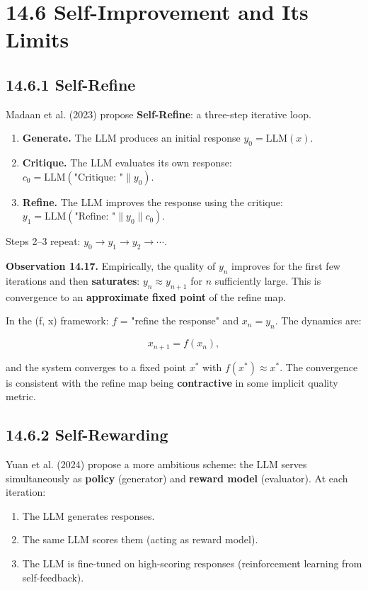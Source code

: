 \section{14.6 Self-Improvement and Its Limits}

\subsection{14.6.1 Self-Refine}

Madaan et al. (2023) propose \textbf{Self-Refine}: a three-step iterative loop.

\begin{enumerate}
  \item \textbf{Generate.} The LLM produces an initial response $y_0 = \mathrm{LLM}(x)$.
  \item \textbf{Critique.} The LLM evaluates its own response: $c_0 = \mathrm{LLM}(\text{"Critique: "} \| y_0)$.
  \item \textbf{Refine.} The LLM improves the response using the critique: $y_1 = \mathrm{LLM}(\text{"Refine: "} \| y_0 \| c_0)$.
\end{enumerate}

Steps 2--3 repeat: $y_0 \to y_1 \to y_2 \to \cdots$.

\textbf{Observation 14.17.} Empirically, the quality of $y_n$ improves for the first few iterations and then \textbf{saturates}: $y_n \approx y_{n+1}$ for $n$ sufficiently large. This is convergence to an \textbf{approximate fixed point} of the refine map.

In the (f, x) framework: $f$ = "refine the response" and $x_n = y_n$. The dynamics are:

\[
x_{n+1} = f(x_n),
\]

and the system converges to a fixed point $x^*$ with $f(x^*) \approx x^*$. The convergence is consistent with the refine map being \textbf{contractive} in some implicit quality metric.

\subsection{14.6.2 Self-Rewarding}

Yuan et al. (2024) propose a more ambitious scheme: the LLM serves simultaneously as \textbf{policy} (generator) and \textbf{reward model} (evaluator). At each iteration:

\begin{enumerate}
  \item The LLM generates responses.
  \item The same LLM scores them (acting as reward model).
  \item The LLM is fine-tuned on high-scoring responses (reinforcement learning from self-feedback).
\end{enumerate}

